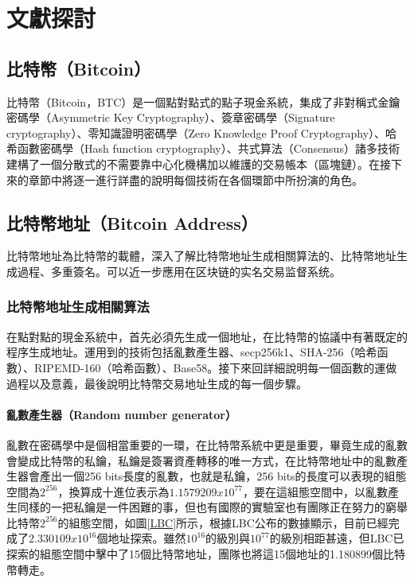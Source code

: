 
\chapter{文獻探討}
	\section{比特幣（Bitcoin）}
	比特幣（Bitcoin，BTC）是一個點對點式的點子現金系統，集成了非對稱式金鑰密碼學（Asymmetric Key Cryptography）\supercite{AsymmetricKeyCryptography}、簽章密碼學（Signature cryptography）、零知識證明密碼學（Zero Knowledge Proof Cryptography）\supercite{Zero-KnowledgeProofsofIdentity}、哈希函數密碼學（Hash function cryptography）、共式算法（Consensus）諸多技術建構了一個分散式的不需要靠中心化機構加以維護的交易帳本（區塊鏈）。在接下來的章節中將逐一進行詳盡的說明每個技術在各個環節中所扮演的角色。

	\section{比特幣地址（Bitcoin Address）}
	比特幣地址為比特幣的載體，深入了解比特幣地址生成相關算法的、比特幣地址生成過程、多重簽名。可以近一步應用在区块链的实名交易监督系统。

		\subsection{比特幣地址生成相關算法}
		在點對點的現金系統中，首先必須先生成一個地址，在比特幣的協議中有著既定的程序生成地址。運用到的技術包括亂數產生器、secp256k1\supercite{johnson2001elliptic}、SHA-256（哈希函數）\supercite{DBLP:conf/fse/KhovratovichRS12}、RIPEMD-160（哈希函數）\supercite{DBLP:conf/isw/MendelPRR06}、Base58\supercite{Base58}。接下來回詳細說明每一個函數的運做過程以及意義，最後說明比特幣交易地址生成的每一個步驟。
		
			\subsubsection{亂數產生器（Random number generator）}
			亂數在密碼學中是個相當重要的一環，在比特幣系統中更是重要，畢竟生成的亂數會變成比特幣的私鑰，私鑰是簽署資產轉移的唯一方式，在比特幣地址中的亂數產生器會產出一個256 bits長度的亂數，也就是私鑰，256 bits的長度可以表現的組態空間為$2^{256}$，換算成十進位表示為$1.1579209x10^{77}$，要在這組態空間中，以亂數產生同樣的一把私鑰是一件困難的事，但也有國際的實驗室\supercite{TheLargeBitcoinCollider}也有團隊正在努力的窮舉比特幣$2^{256}$的組態空間，如圖\ref{LBC}所示，根據LBC公布的數據顯示，目前已經完成了$2.330109x10^{16}$個地址探索。雖然$10^{16}$的級別與$10^{77}$的級別相距甚遠，但LBC已探索的組態空間中擊中了15個比特幣地址，團隊也將這15個地址的1.180899個比特幣轉走。

